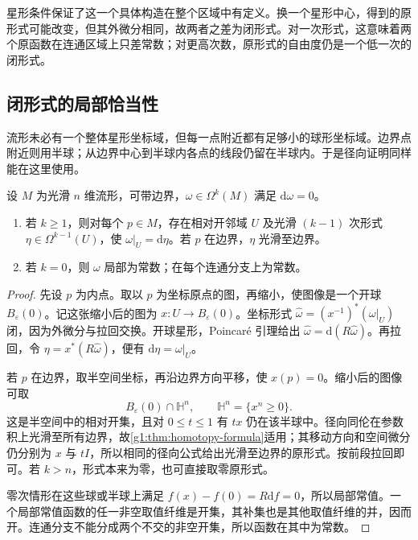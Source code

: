 星形条件保证了这一个具体构造在整个区域中有定义。换一个星形中心，得到的原形式可能改变，但其外微分相同，故两者之差为闭形式。对一次形式，这意味着两个原函数在连通区域上只差常数；对更高次数，原形式的自由度仍是一个低一次的闭形式。

\subsection{闭形式的局部恰当性}
\label{g1:subsec:1402:03}

流形未必有一个整体星形坐标域，但每一点附近都有足够小的球形坐标域。边界点附近则用半球；从边界中心到半球内各点的线段仍留在半球内。于是径向证明同样能在这里使用。

\begin{corollary}
	\label{g1:cor:local-exactness}
	设 \(M\) 为光滑 \(n\) 维流形，可带边界，\(\omega\in\Omega^k(M)\) 满足 \(\mathrm{d}\omega=0\)。
	\begin{enumerate}
		\item 若 \(k\ge1\)，则对每个 \(p\in M\)，存在相对开邻域 \(U\) 及光滑 \((k-1)\) 次形式 \(\eta\in\Omega^{k-1}(U)\)，使 \(\omega|_U=\mathrm{d}\eta\)。若 \(p\) 在边界，\(\eta\) 光滑至边界。
		\item 若 \(k=0\)，则 \(\omega\) 局部为常数；在每个连通分支上为常数。
	\end{enumerate}
\end{corollary}
\begin{proof}
	先设 \(p\) 为内点。取以 \(p\) 为坐标原点的图，再缩小，使图像是一个开球 \(B_\varepsilon(0)\)。记这张缩小后的图为 \(x:U\to B_\varepsilon(0)\)。坐标形式 \(\widehat\omega=(x^{-1})^*(\omega|_U)\) 闭，因为外微分与拉回交换。开球星形，Poincaré 引理给出 \(\widehat\omega=\mathrm{d}(R\widehat\omega)\)。再拉回，令 \(\eta=x^*(R\widehat\omega)\)，便有 \(\mathrm{d}\eta=\omega|_U\)。

	若 \(p\) 在边界，取半空间坐标，再沿边界方向平移，使 \(x(p)=0\)。缩小后的图像可取
	\[
		B_\varepsilon(0)\cap\mathbb H^n,\qquad
		\mathbb H^n=\{x^n\ge0\}.
	\]
	这是半空间中的相对开集，且对 \(0\le t\le1\) 有 \(tx\) 仍在该半球中。径向同伦在参数积上光滑至所有边界，故\cref{g1:thm:homotopy-formula}适用；其移动方向和空间微分仍分别为 \(x\) 与 \(tI\)，所以相同的径向公式给出光滑至边界的原形式。按前段拉回即可。若 \(k>n\)，形式本来为零，也可直接取零原形式。

	零次情形在这些球或半球上满足 \(f(x)-f(0)=R\mathrm{d}f=0\)，所以局部常值。一个局部常值函数的任一非空取值纤维是开集，其补集也是其他取值纤维的并，因而开。连通分支不能分成两个不交的非空开集，所以函数在其中为常数。
\end{proof}

